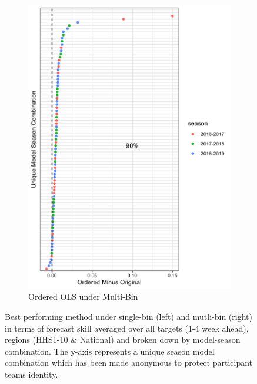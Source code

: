 \documentclass{umassthesis}          %
\begin{document}
\begin{figure}
\begin{subfigure}{.5\textwidth}
    \includegraphics[scale=.15]{multi_bin_ordered.png}
    \caption{Ordered OLS under Multi-Bin}
\end{subfigure}


\caption{Best performing method under single-bin (left) and mutli-bin (right) in terms of forecast skill averaged over all targets (1-4 week ahead), regions (HHS1-10 \& National) and broken down by model-season combination. The y-axis represents a unique season model combination which has been made anonymous to protect participant teams identity. }
\label{fig:model_results}
\end{figure}
\end{document}
